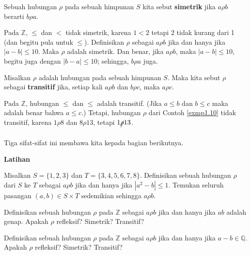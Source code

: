 \begin{defn}
Sebuah hubungan $\rho$ pada sebuah himpunan $S$ kita sebut \textbf{simetrik} jika $a \rho b$ berarti $b \rho a$.
\end{defn}

\begin{exmp}
\label{exmp1.10}
Pada $\mathbb{Z}$, $\leq$ dan $<$ tidak simetrik, karena $1 <2$ tetapi $2$ tidak kurang dari 1 (dan begitu pula untuk $\leq$). Definisikan $\rho$ sebagai $a\rho b$ jika dan hanya jika $|a - b| \leq 10$. Maka $\rho$ adalah simetrik. Dan benar, jika $a\rho b$, maka $|a - b| \leq 10$, begitu juga dengan $|b-a| \leq 10$; sehingga, $b \rho a$ juga.
\end{exmp}

\begin{defn}
Misalkan $\rho$ adalah hubungan pada sebuah himpunan $S$. Maka kita sebut $\rho$ sebagai \textbf{transitif} jika, setiap kali $a \rho b$ dan $b \rho c$, maka $a \rho c$.
\end{defn}

\begin{exmp}
Pada $\mathbb{Z}$, hubungan $\leq$ dan $\le$ adalah transitif. (Jika $a \leq b$ dan $b \leq c$ maka adalah benar bahwa $a \leq c$.) Tetapi, hubungan $\rho$ dari Contoh \ref{exmp1.10} tidak transitif, karena $1 \rho 8$ dan $8 \rho 13$, tetapi $1 \xout{\rho} 13$.
\end{exmp}

Tiga sifat-sifat ini membawa kita kepada bagian berikutnya.
\hfill \break


\textbf{Latihan}

\begin{exc}
Misalkan $S = \{1, 2, 3\}$ dan $T = \{3, 4, 5, 6, 7, 8\}$. Definisikan sebuah hubungan $\rho$ dari $S$ ke $T$ sebagai $a \rho b$ jika dan hanya jika $|a^2 - b| \leq 1$. Temukan seluruh pasangan $(a, b) \in S\times T$ sedemikian sehingga $a \rho b$.
\end{exc}

\begin{exc}
Definisikan sebuah hubungan $\rho$ pada $\mathbb{Z}$ sebagai $a \rho b$ jika dan hanya jika $ab$ adalah genap. Apakah $\rho$ refleksif? Simetrik? Transitif?
\end{exc}

\begin{exc}
Definisikan sebuah hubungan $\rho$ pada $\mathbb{Z}$ sebagai $a \rho b$ jika dan hanya jika $a-b \in \mathbb{Q}$. Apakah $\rho$ refleksif? Simetrik? Transitif?
\end{exc}

